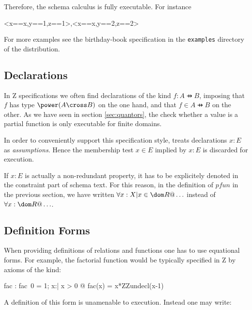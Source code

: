 \documentclass{article}
\begin{document}
Therefore, the schema calculus is fully executable. For instance

\begin{zexecexpr}  \land [y,z:\num | y = z]
\yields
  {<x==x,y==1,z==1>,<x==x,y==2,z==2>}   
\end{zexecexpr}

For more examples see the birthday-book specification in the
\verb:examples: directory of the \Zeta{} distribution.


\subsection{Declarations}
\label{sec:decls}

In Z specifications we often find declarations of the kind $f: A \pfun
B$, imposing that $f$ has type $\power (A \cross B)$ on the one hand,
and that $f \in A \pfun B$ on the other. As we have seen in section
\ref{sec:quantors}, the check whether a value is a partial function is
only executable for finite domains.

In order to conveniently support this specification style, \ZAP{}
treats declarations $x:E$ as \emph{assumptions}. Hence the membership
test $x \in E$ implied by $x:E$ is discarded for execution. 

If $x:E$ is actually a non-redundant property, it has to be
explicitely denoted in the constraint part of schema text.
For this reason, in the definition of $pfun$ in the
previous section, we have written $\forall x: X | x \in \dom R @ \ldots$
instead of $\forall x:\dom R @ \ldots$.



\subsection{Definition Forms}

When providing definitions of relations and functions one has to use
equational forms.  For example, the factorial function would be
typically specified in Z by axioms of the kind:


\begin{axdef}
  fac : \nat \fun \nat
\where
  fac~0 = 1; \forall x:\nat | x > 0 @ fac(x) = x*ZZundecl(x-1)
\end{axdef}

A definition of this form is unamenable to execution. Instead one
may write:
\end{document}
